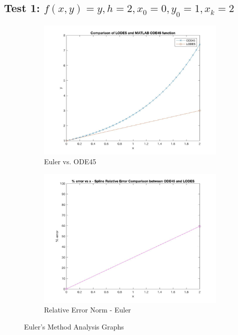 \documentclass[12pt, titlepage]{article}
\begin{document}
\subsection{Test 1: $f(x,y) = y, h = 2,x_0 = 0,y_0 = 1,x_k = 2$} \label{sec_t1}
\begin{figure}[H]
\centering
\begin{subfigure}{.55\textwidth}
  \centering
  \includegraphics[width=\linewidth]{images/Test1/1LODESvsMATLABPlot.jpg}
  \caption{Euler vs. ODE45}
  \label{fig:euler1a}
\end{subfigure}%
\begin{subfigure}{.55\textwidth}
  \centering
  \includegraphics[width=\linewidth]{images/Test1/1RelativeErrorPlot.jpg}
  \caption{Relative Error Norm - Euler}
  \label{fig:euler1b}
\end{subfigure}
\caption{Euler's Method Analysis Graphs}
\label{fig:euler1}
\end{figure}
\end{document}
